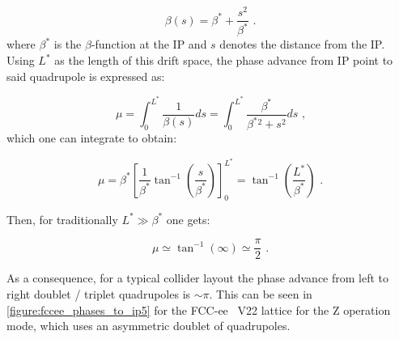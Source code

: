 \begin{equation}
    \beta(s)=\beta^* + \frac{s^2}{\beta^*} \text{ .}
    \label{equation:collider_drift_space_beta_function}
\end{equation}
where \(\beta^{*}\) is the \(\beta\)-function at the IP and \(s\) denotes the distance from the IP.
Using \(L^*\) as the length of this drift space, the phase advance from IP point to said quadrupole is expressed as:

\begin{equation}
    \mu = \int_0^{L^*} \frac{1}{\beta(s)} ds = \int_0^{L^*} \frac{\beta^*}{\beta^*{}^2 + s^2} ds \text{ ,}
    \label{equation:collider_drift_space_phase_advance_integral}
\end{equation}
which one can integrate to obtain:

\begin{equation}
    \mu = \beta^* \left[\frac{1}{\beta^*} \tan^{-1} \left(\frac{s}{\beta^*} \right) \right]_0^{L^*} = \tan^{-1} \left(\frac{L^*}{\beta^*} \right) \text{ .}
    \label{equation:collider_drift_space_phase_advance_integrated}
\end{equation}

Then, for traditionally \(L^* \gg \beta^*\) one gets:

\begin{equation}
    \mu \simeq \tan^{-1} \left( \infty \right) \simeq \frac{\pi}{2} \text{ .}
    \label{equation:collider_drift_space_phase_advance_approximation}
\end{equation}

As a consequence, for a typical collider layout the phase advance from left to right doublet / triplet quadrupoles is \(\sim \pi\).
This can be seen in \cref{figure:fccee_phases_to_ip5} for the FCC-ee~\cite{EPJST:Abada:FCCee_Lepton_Collider} V\num{22} lattice for the Z operation mode, which uses an asymmetric doublet of quadrupoles.


